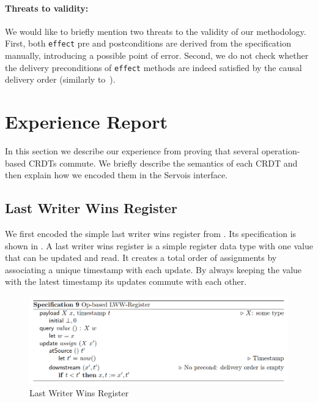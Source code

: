 \documentclass{article}
\newcommand{\TODO}[1]{\hl{\textbf{TODO:} #1}\xspace}
\begin{document}
\paragraph{Threats to validity:} 

We would like to briefly mention two threats to the validity of our
methodology. First, both \texttt{effect} pre and postconditions are
derived from the specification manually, introducing a possible point
of error. Second, we do not check whether the delivery preconditions
of \texttt{effect} methods are indeed satisfied by the causal delivery
order (similarly to~\cite{shapiro2011conflict}).


\section{Experience Report}

In this section we describe our experience from proving that several
operation-based CRDTs commute. We briefly describe the semantics of
each CRDT and then explain how we encoded them in the Servois
interface.

\subsection{Last Writer Wins Register}

We first encoded the simple last writer wins register from
\cite{shapiro2011comprehensive}. Its specification is shown in
. A last writer wins register is a simple register
data type with one value that can be updated and read. It creates a
total order of assignments by associating a unique timestamp with each
update. By always keeping the value with the latest timestamp its
updates commute with each other.

\begin{figure}[h]
    \centering
    \includegraphics[width=\textwidth]{lww-definition}
    \caption{Last Writer Wins Register}
    \label{fig:lww-def}
\end{figure}
\end{document}
